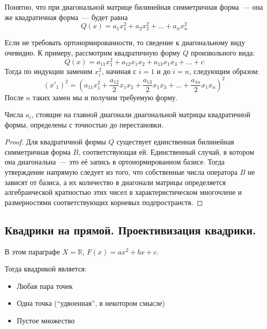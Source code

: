 \documentclass[11pt]{article}
\begin{document}
    \begin{remark}
    Понятно, что при диагональной матрице билинейная симметричная форма~--- она же квадратичная форма~--- будет равна
    \begin{equation*}
        Q(x) = a_1x_1^2 + a_2x_2^2 + \hdots + a_nx_n^2
    \end{equation*}
    \end{remark}

    \begin{remark}
    Если не требовать ортонормированности, то сведение к диагональному виду очевидно. К примеру, рассмотрим квадратичную форму $Q$ произвольного вида:
    \begin{equation*}
        Q(x) = a_{11}x_1^2 + a_{12}x_1x_2 + a_{13}x_1x_3 + \hdots + c
    \end{equation*}
    Тогда по индукции заменим $x_i^2$, начиная с $i = 1$ и до $i = n$, следующим образом:
    \begin{equation*}
        (x'_{1})^2 = (a_{11}x_1^2 + \dfrac{a_{12}}{2}x_1x_2 + \dfrac{a_{13}}{2}x_1x_3 + \hdots + \dfrac{a_{1n}}{2}x_1x_n)^2
    \end{equation*}
    После $n$ таких замен мы и получим требуемую форму.
    \end{remark}

    \begin{lemma}
    Числа $a_i$, стоящие на главной диагонали диагональной матрицы квадратичной формы, определены с точностью до перестановки.
    \end{lemma}

    \begin{proof}
    Для квадратичной формы $Q$ существует единственная билинейная симметричная форма $B$, соответствующая ей. Единственный случай, в котором она диагональна~--- это её запись в ортонормированном базисе. Тогда утверждение напрямую следует из того, что собственные числа оператора $B$ не зависят от базиса, а их количество в диагонали матрицы определяется алгебраической кратностью этих чисел в характеристическом многочлене и размерностями соответствующих корневых подпространств.
    \end{proof}

    \subsection{Квадрики на прямой. Проективизация квадрики.}
    В этом параграфе $X = \mathbb{R}$, $F(x) = ax^2 + bx + c$.

    Тогда квадрикой является:
    \begin{itemize}
        \item Любая пара точек
        \item Одна точка (``удвоенная'', в некотором смысле)
        \item Пустое множество
    \end{itemize}
\end{document}
